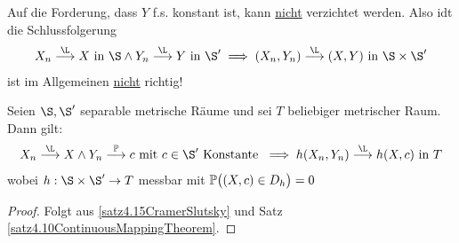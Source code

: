 \begin{bemerkungnr}\label{bemerkung4.16} %
Auf die Forderung, dass $Y$ f.s. konstant ist, kann \underline{nicht} verzichtet werden. Also idt die Schlussfolgerung
\begin{align*}
X_n\stackrel{\L}{\longrightarrow} X\text{ in }\S\wedge Y_n\stackrel{\L}{\longrightarrow} Y\text{ in }\S'
\implies(X_n,Y_n)\stackrel{\L}{\longrightarrow}(X,Y)\text{ in }\S\times\S'
\end{align*}
ist im Allgemeinen \underline{nicht} richtig!
\end{bemerkungnr}

\begin{korollar}\label{korollar4.17}
Seien $\S,\S'$ separable metrische Räume und sei $T$ beliebiger metrischer Raum. Dann gilt:
\begin{align*}
X_n\stackrel{\L}{\longrightarrow} X\wedge Y_n\stackrel{\P}{\longrightarrow} c\mit c\in\S'\text{ Konstante }
\implies h(X_n,Y_n)\stackrel{\L}{\longrightarrow} h(X,c)\text{ in }T
\end{align*}
wobei $h:\S\times\S'\to T$ messbar mit $\P\big((X,c)\in D_h\big)=0$
\end{korollar}
\begin{proof}
Folgt aus \ref{satz4.15CramerSlutsky} und Satz \ref{satz4.10ContinuousMappingTheorem}.
\end{proof}

